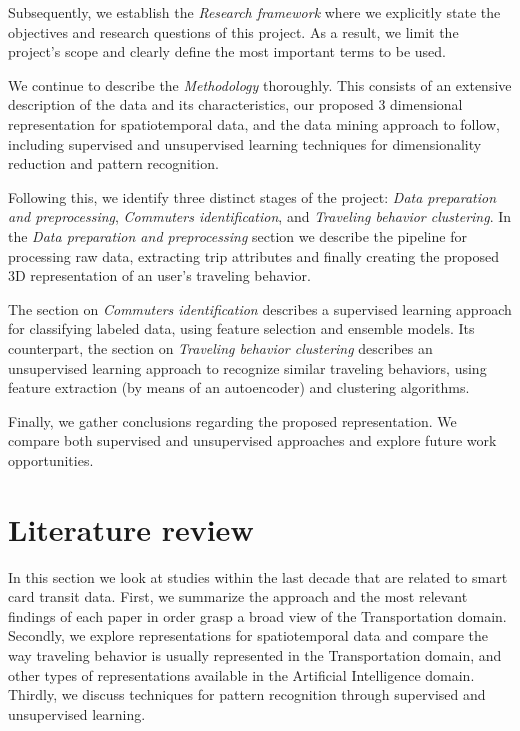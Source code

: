 \documentclass{article}
\begin{document}
Subsequently, we establish the \textit{Research framework} where we explicitly state the objectives and research questions of this project. As a result, we limit the project's scope and clearly define the most important terms to be used. 

We continue to describe the \textit{Methodology} thoroughly. This consists of an extensive description of the data and its characteristics, our proposed 3 dimensional representation for spatiotemporal data, and the data mining approach to follow, including supervised and unsupervised learning techniques for dimensionality reduction and pattern recognition.

Following this, we identify three distinct stages of the project: \textit{Data preparation and preprocessing}, \textit{Commuters identification}, and \textit{Traveling behavior clustering}. In the \textit{Data preparation and preprocessing} section we describe the pipeline for processing raw data, extracting trip attributes and finally creating the proposed 3D representation of an user's traveling behavior. 

The section on \textit{Commuters identification} describes a supervised learning approach for classifying labeled data, using feature selection and ensemble models. Its counterpart, the section on \textit{Traveling behavior clustering} describes an unsupervised  learning approach to recognize similar traveling behaviors, using feature extraction (by means of an autoencoder) and clustering algorithms. 

Finally, we gather conclusions regarding the proposed representation. We compare both supervised and unsupervised approaches and explore future work opportunities. 

\newpage
\section{Literature review}
In this section we look at studies within the last decade that are related to smart card transit data. First, we summarize the approach and the most relevant findings of each paper in order grasp a broad view of the Transportation domain. Secondly, we explore representations for spatiotemporal data and compare the way traveling behavior is usually represented in the Transportation domain, and other types of representations available in the Artificial Intelligence domain. Thirdly, we discuss techniques for pattern recognition through supervised and unsupervised learning. %
\end{document}
